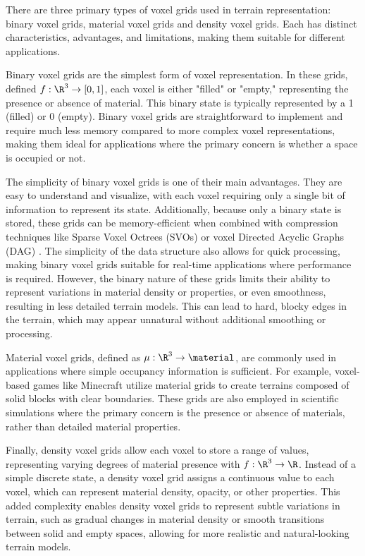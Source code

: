 There are three primary types of voxel grids used in terrain representation: binary voxel grids, material voxel grids and density voxel grids. Each has distinct characteristics, advantages, and limitations, making them suitable for different applications. 

Binary voxel grids are the simplest form of voxel representation. In these grids, defined $f: \R^3 \to [0, 1]$, each voxel is either "filled" or "empty," representing the presence or absence of material. This binary state is typically represented by a 1 (filled) or 0 (empty). Binary voxel grids are straightforward to implement and require much less memory compared to more complex voxel representations, making them ideal for applications where the primary concern is whether a space is occupied or not.

The simplicity of binary voxel grids is one of their main advantages. They are easy to understand and visualize, with each voxel requiring only a single bit of information to represent its state. Additionally, because only a binary state is stored, these grids can be memory-efficient when combined with compression techniques like Sparse Voxel Octrees (SVOs) \cite{Laine2010} or voxel Directed Acyclic Graphs (DAG) \cite{Villanueva2017,Careil2020}. The simplicity of the data structure also allows for quick processing, making binary voxel grids suitable for real-time applications where performance is required. However, the binary nature of these grids limits their ability to represent variations in material density or properties, or even smoothness, resulting in less detailed terrain models. This can lead to hard, blocky edges in the terrain, which may appear unnatural without additional smoothing or processing.

Material voxel grids, defined as $\mu: \R^3 \to \material$, are commonly used in applications where simple occupancy information is sufficient. For example, voxel-based games like Minecraft utilize material grids to create terrains composed of solid blocks with clear boundaries. These grids are also employed in scientific simulations where the primary concern is the presence or absence of materials, rather than detailed material properties.

Finally, density voxel grids allow each voxel to store a range of values, representing varying degrees of material presence with $f: \R^3 \to \R$. Instead of a simple discrete state, a density voxel grid assigns a continuous value to each voxel, which can represent material density, opacity, or other properties. This added complexity enables density voxel grids to represent subtle variations in terrain, such as gradual changes in material density or smooth transitions between solid and empty spaces, allowing for more realistic and natural-looking terrain models.

